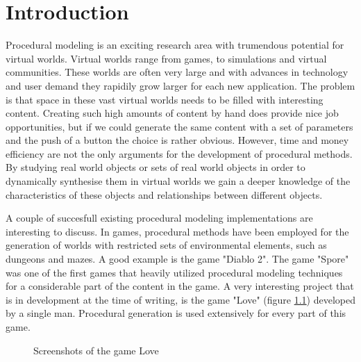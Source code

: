 
\chapter{Introduction}
\label{sec:intro}


Procedural modeling is an exciting research area with trumendous potential for virtual worlds. Virtual worlds range from games, to simulations and virtual communities. These worlds are often very large and with advances in technology and user demand they rapidily grow larger for each new application. The problem is that space in these vast virtual worlds needs to be filled with interesting content. Creating such high amounts of content by hand does provide nice job opportunities, but if we could generate the same content with a set of parameters and the push of a button the choice is rather obvious. However, time and money efficiency are not the only arguments for the development of procedural methods. By studying real world objects or sets of real world objects in order to dynamically synthesise them in virtual worlds we gain a deeper knowledge of the characteristics of these objects and relationships between different objects. 

A couple of succesfull existing procedural modeling implementations are interesting to discuss. In games, procedural methods have been employed for the generation of worlds with restricted sets of environmental elements, such as dungeons and mazes. A good example is the game "Diablo 2". The game "Spore" was one of the first games that heavily utilized procedural modeling techniques for a considerable part of the content in the game. A very interesting project that is in development at the time of writing, is the game "Love" (figure \ref{fig:love}) developed by a single man. Procedural generation is used extensively for every part of this game.
      
\begin{figure}[ht]
\centering
{}

\label{fig:love}
\caption[]{Screenshots of the game Love}
\end{figure}


